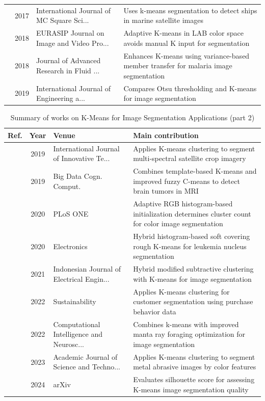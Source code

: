 \begin{table}[!t]
\begin{tabularx}{\textwidth}{@{}l c p{3.6cm} X@{}}
\cite{manahoran2017means} & 2017 & International Journal of MC Square Sci... & Uses k-means segmentation to detect ships in marine satellite images \\
\cite{zheng2018image} & 2018 & EURASIP Journal on Image and Video Pro... & Adaptive K-means in LAB color space avoids manual K input for segmentation \\
\cite{nasir2018enhanced} & 2018 & Journal of Advanced Research in Fluid ... & Enhances K-means using variance-based member transfer for malaria image segmentation \\
\cite{kumar2019comparative} & 2019 & International Journal of Engineering a... & Compares Otsu thresholding and K-means for image segmentation \\
\bottomrule
\end{tabularx}
\end{table}

\begin{table}[!t]
\centering
\renewcommand{\arraystretch}{1.2}
\caption{Summary of works on K-Means for Image Segmentation Applications (part 2)}
\begin{tabularx}{\textwidth}{@{}l c p{3.6cm} X@{}}
\toprule
\textbf{Ref.} & \textbf{Year} & \textbf{Venue} & \textbf{Main contribution} \\
\midrule
\cite{kazakhstan2019multi} & 2019 & International Journal of Innovative Te... & Applies K-means clustering to segment multi-spectral satellite crop imagery \\
\cite{alam2019automatic} & 2019 & Big Data Cogn. Comput. & Combines template-based K-means and improved fuzzy C-means to detect brain tumors in MRI \\
\cite{basar2020unsupervised} & 2020 & PLoS ONE & Adaptive RGB histogram-based initialization determines cluster count for color image segmentation \\
\cite{h2020leukemia} & 2020 & Electronics & Hybrid histogram-based soft covering rough K-means for leukemia nucleus segmentation \\
\cite{tongbram2021segmentation} & 2021 & Indonesian Journal of Electrical Engin... & Hybrid modified subtractive clustering with K-means for image segmentation \\
\cite{tabianan2022means} & 2022 & Sustainability & Applies K-means clustering for customer segmentation using purchase behavior data \\
\cite{zhu2022means} & 2022 & Computational Intelligence and Neurosc... & Combines k-means with improved manta ray foraging optimization for image segmentation \\
\cite{zhang2023metal} & 2023 & Academic Journal of Science and Techno... & Applies K-means clustering to segment metal abrasive images by color features \\
\cite{myagmarsuren2024exploring} & 2024 & arXiv & Evaluates silhouette score for assessing K-means image segmentation quality \\
\bottomrule
\end{tabularx}
\end{table}

